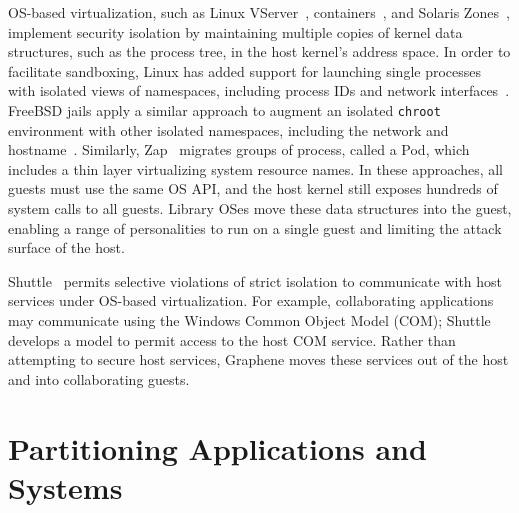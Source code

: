 
OS-based virtualization, such as 
Linux VServer~\citep{vserver},  containers~\citep{bhattiprolu08containers},
and Solaris Zones~\citep{price04zones},
implement security isolation by maintaining multiple copies of kernel data structures,
such as the process tree,
in the host kernel's address space.
In order to facilitate sandboxing, 
Linux has added support for launching single processes
with isolated views of namespaces, including process IDs and network interfaces~\citep{lwn-namespaces}.
FreeBSD jails apply a similar approach to augment an isolated {\tt chroot} environment
with other isolated namespaces, including the network and hostname~\citep{jails}.
Similarly, Zap~\citep{osman02zap} migrates groups of process, called a Pod,
which includes a thin layer virtualizing system resource names.
In these approaches, all guests must use the same OS API, and the host kernel
still exposes hundreds of system calls to all guests.
Library OSes move these data structures into the guest, enabling
a range of personalities to run on a single guest and limiting the attack surface
of the host.


Shuttle~\citep{shan12shuttle} permits selective violations of strict isolation
to communicate with host services 
under OS-based virtualization.
For example, collaborating applications may communicate using the Windows Common Object Model (COM);
Shuttle develops a model to permit access to the host COM service.
Rather than attempting to secure host services,
Graphene moves these services out of the host
and into collaborating guests.



\section{Partitioning Applications and Systems}

